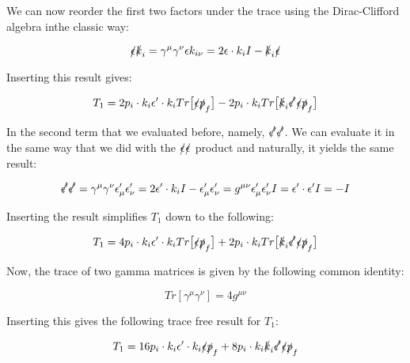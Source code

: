 \documentclass[a4]{article}
\begin{document}
    We can now reorder the first two factors under the trace using the Dirac-Clifford algebra inthe classic way:

    \begin{equation}
        \slashed{\epsilon} \slashed{k}_i = \gamma^{\mu} \gamma^{\nu} \epsilon k_{i \nu} = 2 \epsilon \cdot k_i I - \slashed{k}_i \slashed{\epsilon}
    \end{equation}

    Inserting this result gives:

    \begin{equation}
        T_1 = 2 p_i \cdot k_i \epsilon' \cdot k_i Tr \big[ \slashed{\epsilon} \slashed{p}_f \big] - 2 p_i \cdot k_i Tr \big[ \slashed{k}_i \slashed{\epsilon'} \slashed{\epsilon} \slashed{p}_f \big]
    \end{equation}

    In the second term that we evaluated before, namely, $\slashed{\epsilon'} \slashed{\epsilon'}$. We can evaluate it in the same way that we did with the $\slashed{\epsilon} \slashed{\epsilon}$ product and naturally, it yields
    the same result:

    \begin{equation}
        \slashed{\epsilon'} \slashed{\epsilon'} = \gamma^{\mu} \gamma^{\nu} \epsilon'_\mu \epsilon'_\nu = 2 \epsilon' \cdot k_i I - \epsilon'_\mu \epsilon'_\nu = g^{\mu \nu} \epsilon'_\mu \epsilon'_\nu I = \epsilon' \cdot \epsilon' I = - I
    \end{equation}

    Inserting the result simplifies $T_1$ down to the following:

    \begin{equation}
        T_1 = 4 p_i \cdot k_i \epsilon' \cdot k_i Tr \big[ \slashed{\epsilon} \slashed{p}_f \big] + 2 p_i \cdot k_i Tr \big[ \slashed{k}_i \slashed{\epsilon'} \slashed{\epsilon} \slashed{p}_f \big]
    \end{equation}

    Now, the trace of two gamma matrices is given by the following common identity:

    \begin{equation}
        Tr [\gamma^\mu \gamma^\nu] = 4 g^{\mu \nu}
    \end{equation}

    Inserting this gives the following trace free result for $T_1$:

    \begin{equation}
        T_1 = 16 p_i \cdot k_i \epsilon' \cdot k_i \slashed{\epsilon} \slashed{p}_f + 8 p_i \cdot k_i \slashed{k}_i \slashed{\epsilon'} \slashed{\epsilon} \slashed{p}_f
    \end{equation}
\end{document}
